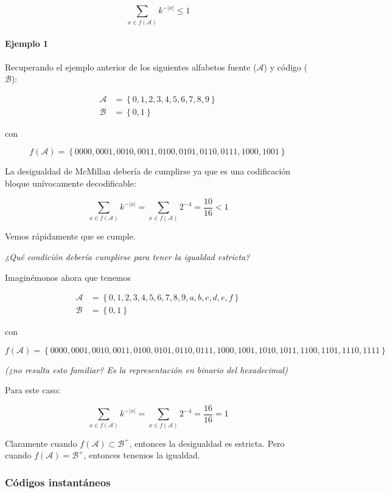 \[
\sum_{x\in f(\mathcal{A})} k^{-\left|x\right|}\leq 1
\]

\paragraph{Ejemplo 1}\label{ejemplo-1-2}

Recuperando el ejemplo anterior de los siguientes alfabetos fuente
(\(\mathcal{A}\)) y código (\(\mathcal{B}\)):


\begin{align*}
\mathcal{A} &=\left\{0,1,2,3,4,5,6,7,8,9\right\}\\
\mathcal{B} &=\left\{0,1\right\}
\end{align*}


con

\[
f(\mathcal{A}) = \left\{0000, 0001, 0010, 0011, 0100, 0101, 0110, 0111, 1000, 1001\right\}
\]

La desigualdad de McMillan debería de cumplirse ya que es una
codificación bloque unívocamente decodificable:

\[
\sum_{x\in f(\mathcal{A})} k^{-\left|x\right|} = \sum_{x\in f(\mathcal{A})} 2^{-4} = \frac{10}{16} < 1
\]

Vemos rápidamente que se cumple.

\emph{¿Qué condición debería cumplirse para tener la igualdad estricta?}

Imaginémonos ahora que tenemos


\begin{align*}
\mathcal{A} &=\left\{0,1,2,3,4,5,6,7,8,9,a,b,c,d,e,f\right\}\\
\mathcal{B} &=\left\{0,1\right\}
\end{align*}


con

\[
f(\mathcal{A}) = \left\{0000, 0001, 0010, 0011, 0100, 0101, 0110, 0111, 1000, 1001,1010,1011,1100,1101, 1110,1111\right\}
\]

\emph{(¿no resulta esto familiar? Es la representación en binario del
hexadecimal)}

Para este caso:

\[
\sum_{x\in f(\mathcal{A})} k^{-\left|x\right|} = \sum_{x\in f(\mathcal{A})} 2^{-4} = \frac{16}{16} = 1
\]

Claramente cuando \(f(\mathcal{A})\subset\mathcal{B}^+\), entonces la
desigualdad es estricta. Pero cuando \(f(\mathcal{A})=\mathcal{B}^+\),
entonces tenemos la igualdad.

\subsubsection{Códigos instantáneos}\label{cuxf3digos-instantuxe1neos}

